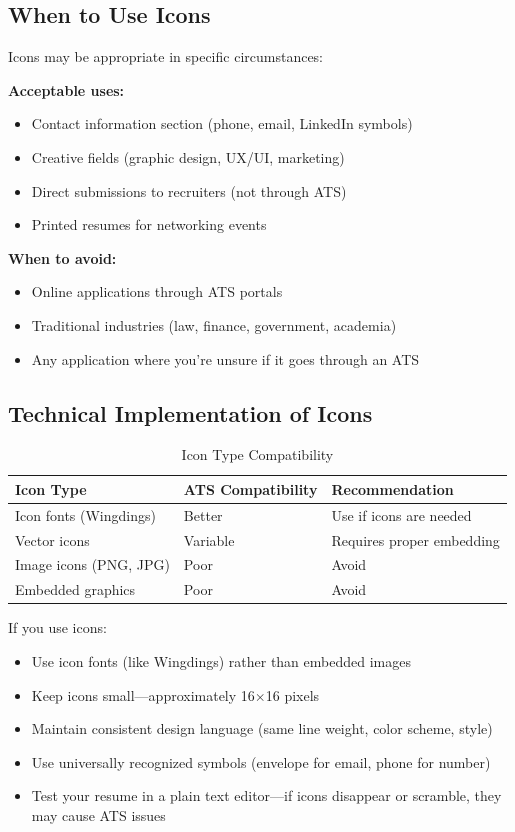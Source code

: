\documentclass[11pt,a4paper]{article}
\begin{document}
\subsection{When to Use Icons}

Icons may be appropriate in specific circumstances:

\textbf{Acceptable uses:}
\begin{itemize}
    \item Contact information section (phone, email, LinkedIn symbols)
    \item Creative fields (graphic design, UX/UI, marketing)
    \item Direct submissions to recruiters (not through ATS)
    \item Printed resumes for networking events
\end{itemize}

\textbf{When to avoid:}
\begin{itemize}
    \item Online applications through ATS portals
    \item Traditional industries (law, finance, government, academia)
    \item Any application where you're unsure if it goes through an ATS
\end{itemize}

\subsection{Technical Implementation of Icons}

\begin{table}[h]
\centering
\begin{tabular}{@{}lll@{}}
\toprule
\textbf{Icon Type} & \textbf{ATS Compatibility} & \textbf{Recommendation} \\
\midrule
Icon fonts (Wingdings) & Better & Use if icons are needed \\
Vector icons & Variable & Requires proper embedding \\
Image icons (PNG, JPG) & Poor & Avoid \\
Embedded graphics & Poor & Avoid \\
\bottomrule
\end{tabular}
\caption{Icon Type Compatibility}
\end{table}

\begin{bestpractice}
If you use icons:
\begin{itemize}[noitemsep]
    \item Use icon fonts (like Wingdings) rather than embedded images
    \item Keep icons small---approximately 16$\times$16 pixels
    \item Maintain consistent design language (same line weight, color scheme, style)
    \item Use universally recognized symbols (envelope for email, phone for number)
    \item Test your resume in a plain text editor---if icons disappear or scramble, they may cause ATS issues
\end{itemize}
\end{bestpractice}
\end{document}
